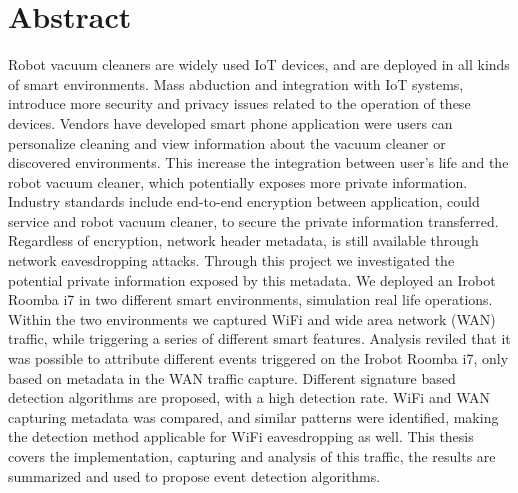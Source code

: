 \chapter*{Abstract}

Robot vacuum cleaners are widely used IoT devices, and are deployed in all kinds of smart environments. Mass abduction and integration with IoT systems, introduce more security and privacy issues related to the operation of these devices. Vendors have developed smart phone application were users can personalize cleaning and view information about the vacuum cleaner or discovered environments. This increase the integration between user's life and the robot vacuum cleaner, which potentially exposes more private information. Industry standards include end-to-end encryption between application, could service and robot vacuum cleaner, to secure the private information transferred. Regardless of encryption, network header metadata, is still available through network eavesdropping attacks. Through this project we investigated the potential private information exposed by this metadata. We deployed an Irobot Roomba i7 in two different smart environments, simulation real life operations. Within the two environments we captured WiFi and wide area network (WAN) traffic, while triggering a series of different smart features. Analysis reviled that it was possible to attribute different events triggered on the Irobot Roomba i7, only based on metadata in the WAN traffic capture. Different signature based detection algorithms are proposed, with a high detection rate. WiFi and WAN capturing metadata was compared, and similar patterns were identified, making the detection method applicable for WiFi eavesdropping as well. This thesis covers the implementation, capturing and analysis of this traffic, the results are summarized and used to propose event detection algorithms.    


